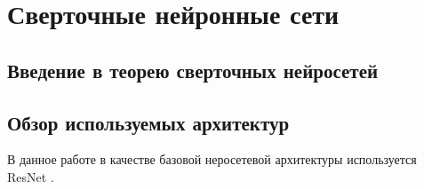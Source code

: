 \section{Сверточные нейронные сети}



\subsection{Введение в теорею сверточных нейросетей}



\subsection{Обзор используемых архитектур}
В данное работе в качестве базовой неросетевой архитектуры используется
ResNet \cite{resnet}.